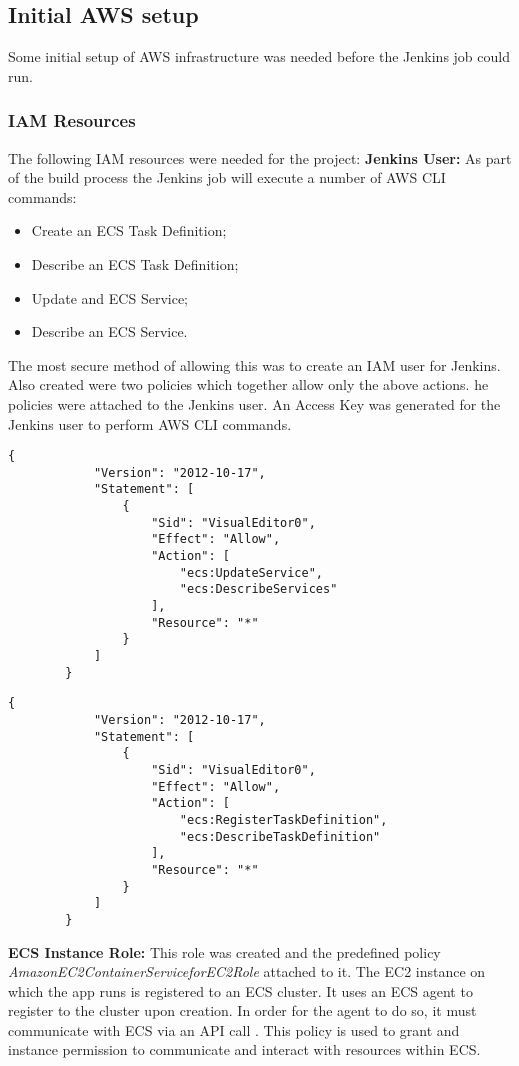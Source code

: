 	\subsection{Initial AWS setup}
		Some initial setup of AWS infrastructure was needed before the Jenkins job could run.
	
		\subsubsection{IAM Resources}
		The following IAM resources were needed for the project:
		\medbreak
		\noindent \textbf{Jenkins User:} As part of the build process the Jenkins job will execute a number of AWS CLI commands:
			\begin{itemize}
				\item Create an ECS Task Definition;
				\item Describe an ECS Task Definition;
				\item Update and ECS Service;
				\item Describe an ECS Service.
			\end{itemize}
		The most secure method of allowing this was to create an IAM user for Jenkins. Also created were two policies which together allow only the above actions. he policies were attached to the Jenkins user. An Access Key was generated for the Jenkins user to perform AWS CLI commands.
			
		\begin{minipage}{\textwidth}
		\begin{lstlisting}[caption={Task Definition Policy}]
		{
			"Version": "2012-10-17",
			"Statement": [
				{
					"Sid": "VisualEditor0",
					"Effect": "Allow",
					"Action": [
						"ecs:UpdateService",
						"ecs:DescribeServices"
					],
					"Resource": "*"
				}
			]
		}
		\end{lstlisting}
		\end{minipage}
					
		\begin{minipage}{\textwidth}
		\begin{lstlisting}[caption={Service Policy}]
		{
			"Version": "2012-10-17",
			"Statement": [
				{
					"Sid": "VisualEditor0",
					"Effect": "Allow",
					"Action": [
						"ecs:RegisterTaskDefinition",
						"ecs:DescribeTaskDefinition"
					],
					"Resource": "*"
				}
			]
		}
		\end{lstlisting}
		\end{minipage}
		
		\noindent \textbf{ECS Instance Role:} This role was created and the predefined policy \textit{AmazonEC2ContainerServiceforEC2Role} attached to it. The EC2 instance on which the app runs is registered to an ECS cluster. It uses an ECS agent to register to the cluster upon creation. In order for the agent to do so, it must communicate with ECS via an API call \citep{aws-agent}. This policy is used to grant and instance permission to communicate and interact with resources within ECS.
					
